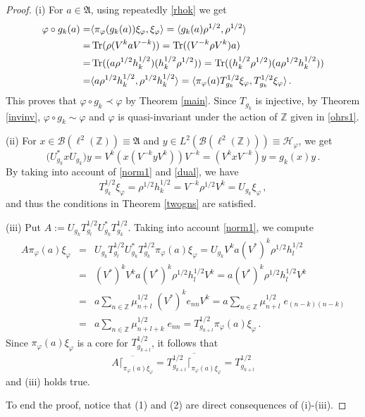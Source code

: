 \documentclass[12pt]{amsart}
\numberwithin{equation}{section}
\def\cb{{\mathcal B}}
\def\ch{{\mathcal H}}
\def\ga{{\mathfrak A}} \def\gpa{{\mathfrak a}}
\def\bz{{\mathbb Z}}
\def\f{\varphi}\def\ff{\phi} \def\F{\Phi}
\def\tr{\mathop{\rm Tr}}
\begin{document}
\begin{proof}
(i) For $a\in\ga$, using repeatedly \eqref{rhok} we get
\begin{align*}
\f\circ g_k(a)=&\langle \pi_\f(g_k(a))\xi_\f,\xi_\f\rangle
              =\langle g_k(a)\rho^{1/2},\rho^{1/2}\rangle\\
							=&\tr(\rho(V^{k}aV^{-k}))
							=\tr((V^{-k}\rho V^{k})a)\\
							=&\tr((a\rho^{1/2}h_k^{1/2})(h_k^{1/2}\rho^{1/2}))
							=\tr((h_k^{1/2}\rho^{1/2})(a\rho^{1/2}h_k^{1/2}))\\
							=&\langle a\rho^{1/2}h_k^{1/2},\rho^{1/2}h_k^{1/2}\rangle
							=\langle \pi_\f(a)T^{1/2}_{g_k}\xi_\f,T^{1/2}_{g_k}\xi_\f\rangle\,.
\end{align*}
This proves that $\f\circ g_k\prec \f$ by Theorem \ref{main}. Since $T_{g_k}$ is injective, by Theorem \ref{invinv}, $\f\circ g_k\sim\f$ and $\f$ is quasi-invariant under the action of $\bz$ given in \eqref{ohrs1}.

(ii) For $x\in\cb(\ell^2(\mathbb Z))\equiv\ga$ and $y\in L^2(\cb(\ell^2(\mathbb Z)))\equiv\ch_\f$, we get
$$
\big(U_{g_k}^*xU_{g_k}\big)y=V^k(x(V^{-k}yV^k))V^{-k}=(V^k xV^{-k})y=g_k(x)y\,.
$$
By taking into account of \eqref{norm1} and \eqref{dual}, we have
$$
T^{1/2}_{g_k}\xi_\f=\rho^{1/2}h_k^{1/2}=V^{-k}\rho^{1/2} V^k=U_{g_k}\xi_\f\,,
$$
and thus the conditions in Theorem \ref{twogns} are satisfied.

(iii) Put $A:=U_{g_k}T_{g_l}^{1/2}U_{g_k}^*T_{g_k}^{1/2}$. Taking into account \eqref{norm1},
we compute
\begin{eqnarray*}
A\pi_\f(a)\xi_\f&=&U_{g_k}T^{1/2}_{g_l}U_{g_k}^*T_{g_k}^{1/2}\pi_\f(a)\xi_\f
                  =U_{g_k}V^ka(V^*)^k\rho^{1/2}h_l^{1/2}\\
									&=&(V^*)^{k}V^ka(V^*)^k\rho^{1/2}h_l^{1/2}V^k
									=a(V^*)^k\rho^{1/2}h_l^{1/2}V^k\\
									&=&a\sum_{n\in\mathbb Z}\mu_{n+l}^{1/2}\;(V^*)^ke_{nn}V^k
									=a\sum_{n\in\mathbb Z}\mu_{n+l}^{1/2}\;e_{(n-k)(n-k)}\\
									&=&a\sum_{n\in\mathbb Z}\mu_{n+l+k}^{1/2}\;e_{nn}
									=T^{1/2}_{g_{k+l}}\pi_\f(a)\xi_\f\,.
\end{eqnarray*}
Since $\pi_\f(a)\xi_\f$ is a core for $T^{1/2}_{g_{k+l}}$, it follows that 
$$
\overline{A\lceil_{\pi_\f(a)\xi_\f}}=\overline{T^{1/2}_{g_{k+l}}\lceil_{\pi_\f(a)\xi_\f}}=T^{1/2}_{g_{k+l}}
$$ 
and (iii) holds true.

To end the proof, notice that (1) and (2) are direct consequences of (i)-(iii).
\end{proof}
\end{document}
